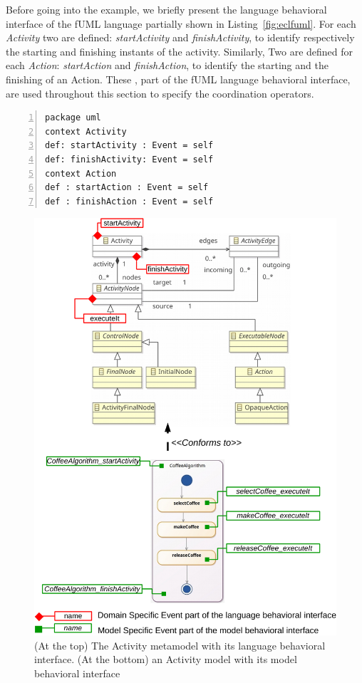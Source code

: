 Before going into the example, we briefly present the language behavioral interface of the fUML language partially shown in  Listing~\ref{fig:eclfuml}. For each \emph{Activity} two \dse are defined: \emph{startActivity} and \emph{finishActivity}, to identify respectively the starting and finishing instants of the activity. Similarly, Two \dse are defined for each \emph{Action}: \emph{startAction} and \emph{finishAction}, to identify the starting and the finishing of an Action. These \dse, part of the fUML language behavioral interface, are used throughout this section to specify the coordination operators.

\begin{lstlisting}[language=ecl,
caption={Partial \ecl specification of Activity Diagram},
label={fig:eclfuml}, 
basicstyle=\scriptsize\ttfamily, backgroundcolor=\color{LGrey}, numbers=left, xleftmargin=3pt, belowskip=-0.4em]
package uml
context Activity
def: startActivity : Event = self
def: finishActivity: Event = self
context Action
def : startAction : Event = self
def : finishAction : Event = self
\end{lstlisting}

\begin{figure}
	\begin{center}
		\includegraphics[width=1\textwidth]{appendix/figs/activitylang}
		\caption{(At the top) The Activity metamodel with its language behavioral interface. (At the bottom) an Activity model with its model behavioral interface}
		\label{fig:tfsmmm}
	\end{center}
\end{figure}
